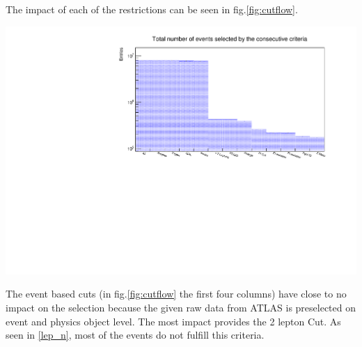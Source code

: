 \documentclass[12pt, a4paper, bibliography=totoc]{scrartcl}
\begin{document}
\begin{multicols}{2}
The impact of each of the restrictions can be seen in fig.\ref{fig:cutflow}. 
\begin{center}
	\includegraphics[width=\linewidth]{fig/cutflow.pdf}
	\label{fig:cutflow}
\end{center}
The event based cuts (in fig.\ref{fig:cutflow} the first four columns) have close to no impact on the selection because the given raw data from ATLAS is preselected on event and physics object level.
The most impact provides the 2 lepton Cut. As seen in \ref{lep_n}, most of the events do not fulfill this criteria.



\end{multicols}
\end{document}
